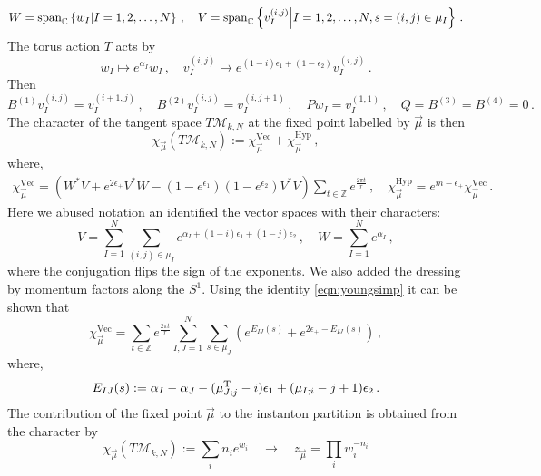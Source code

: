 \documentclass[main.tex]{subfiles}
\begin{document}
\begin{equation}
 W=\operatorname{span}_{\mathbb{C}}\left\{w_I\middle|I=1,2,\dots,N\right\}\,,\quad V=\operatorname{span}_{\mathbb{C}}\left\{v^{(i,j)}_{I}\middle|I=1,2,\dots,N,s=(i,j)\in\mu_I\right\}\,.
\end{equation} 
The torus action $T$ acts by
\begin{equation}
w_I\mapsto e^{\alpha_I}w_I\,,\quad v^{(i,j)}_{I}\mapsto e^{(1-i)\epsilon_1+(1-\epsilon_2)}v^{(i,j)}_{I}\,.
\end{equation}
Then
\begin{equation}\label{eqn:fixedpoint}
B^{(1)}v^{(i,j)}_{I}=v^{(i+1,j)}_{I}\,,\quad B^{(2)}v^{(i,j)}_{I}=v^{(i,j+1)}_{I}\,,\quad Pw_I=v^{(1,1)}_{I}\,,\quad Q=B^{(3)}=B^{(4)}=0\,.
\end{equation}
The character of the tangent space $T\mathcal{M}_{k,N}$ at the fixed point labelled by $\vec{\mu}$ is then
\begin{equation}\label{eqn:ind}
\chi_{\vec{\mu}}\left(T\mathcal{M}_{k,N}\right):=\chi_{\vec{\mu}}^{\text{Vec}}+\chi_{\vec{\mu}}^{\text{Hyp}}\,,
\end{equation}
where,
\begin{align}
\chi_{\vec{\mu}}^{\text{Vec}}=\left(W^*V+e^{2\epsilon_+}V^*W-(1-e^{\epsilon_1})(1-e^{\epsilon_2})V^*V\right)\sum_{t\in\mathbb{Z}}e^{\frac{2\pi t}{r}}\,,\quad\chi_{\vec{\mu}}^{\text{Hyp}}=e^{m-\epsilon_+}\chi_{\vec{\mu}}^{\text{Vec}}\,.
\end{align}
Here we abused notation an identified the vector spaces with their characters:
\begin{equation}
V=\sum_{I=1}^N\sum_{(i,j)\in\mu_I}e^{\alpha_I+(1-i)\epsilon_1+(1-j)\epsilon_2}\,,\quad W=\sum_{I=1}^Ne^{\alpha_I}\,,
\end{equation}
where the conjugation flips the sign of the exponents. We also added the dressing by momentum factors along the $S^1$. Using the identity \eqref{eqn:youngsimp} it can be shown that
\begin{equation}
\chi_{\vec{\mu}}^{\text{Vec}}=\sum_{t\in\mathbb{Z}}e^{\frac{2\pi t}{r}}\sum_{I,J=1}^N\sum_{s\in\mu_J}\left(e^{E_{IJ}(s)}+e^{2\epsilon_+-E_{IJ}(s)}\right)\,,
\end{equation}
where,
\begin{equation}
E_{IJ}(s):=\alpha_I-\alpha_J-(\mu^{\operatorname{T}}_{J;j}-i)\epsilon_1+(\mu_{I;i}-j+1)\epsilon_2\,.
\end{equation}
The contribution of the fixed point $\vec{\mu}$ to the instanton partition is obtained from the character by
\begin{equation}\label{eqn:conversionrule}
\chi_{\vec{\mu}}\left(T\mathcal{M}_{k,N}\right):=\sum_{i}n_ie^{w_i}\quad \to \quad z_{\vec{\mu}}=\prod_{i}w_i^{-n_i}
\end{equation}
\end{document}
